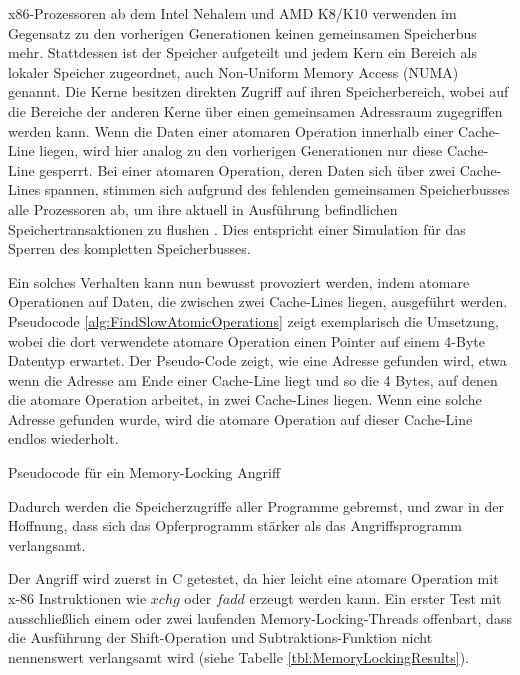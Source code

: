 x86-Prozessoren ab dem Intel Nehalem und AMD K8/K10 verwenden im Gegensatz zu den vorherigen Generationen keinen gemeinsamen Speicherbus mehr. Stattdessen ist der Speicher aufgeteilt und jedem Kern ein Bereich als lokaler Speicher zugeordnet, auch Non-Uniform Memory Access (NUMA) genannt. 
Die Kerne besitzen direkten Zugriff auf ihren Speicherbereich, wobei auf die Bereiche der anderen Kerne über einen gemeinsamen Adressraum zugegriffen werden kann.
Wenn die Daten einer atomaren Operation innerhalb einer Cache-Line liegen, wird hier analog zu den vorherigen Generationen nur diese Cache-Line gesperrt.
Bei einer atomaren Operation, deren Daten sich über zwei Cache-Lines spannen, stimmen sich aufgrund des fehlenden gemeinsamen Speicherbusses alle Prozessoren ab, um ihre aktuell in Ausführung befindlichen Speichertransaktionen zu flushen \cite{MemoryLockingWu}.
Dies entspricht einer Simulation für das Sperren des kompletten Speicherbusses.

Ein solches Verhalten kann nun bewusst provoziert werden, indem atomare Operationen auf Daten, die zwischen zwei Cache-Lines liegen, ausgeführt werden. Pseudocode \ref{alg:FindSlowAtomicOperations} zeigt exemplarisch die Umsetzung, wobei die dort verwendete atomare Operation einen Pointer auf einem 4-Byte Datentyp erwartet. 
Der Pseudo-Code zeigt, wie eine Adresse gefunden wird, etwa wenn die Adresse am Ende einer Cache-Line liegt und so die 4 Bytes, auf denen die atomare Operation arbeitet, in zwei Cache-Lines liegen. 
Wenn eine solche Adresse gefunden wurde, wird die atomare Operation auf dieser Cache-Line endlos wiederholt.

\begin{algorithm}[h]
\DontPrintSemicolon
\caption{Pseudocode für ein Memory-Locking Angriff}
\label{alg:FindSlowAtomicOperations}

\end{algorithm}

Dadurch werden die Speicherzugriffe aller Programme gebremst, und zwar in der Hoffnung, dass sich das Opferprogramm stärker als das Angriffsprogramm verlangsamt.

Der Angriff wird zuerst in C getestet, da hier leicht eine atomare Operation mit x-86 Instruktionen wie $xchg$ oder $fadd$ erzeugt werden kann.
Ein erster Test mit ausschließlich einem oder zwei laufenden Memory-Locking-Threads offenbart, dass die Ausführung der Shift-Operation und Subtraktions-Funktion nicht nennenswert verlangsamt wird (siehe Tabelle \ref{tbl:MemoryLockingResults}).

